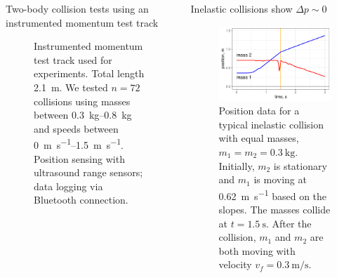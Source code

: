 \documentclass[pdf,serif]{beamer}
\begin{document}
\begin{frame}{}
\begin{columns}[T,totalwidth=\textwidth]
\begin{column}{14.33in}
\begin{minipage}[t][\textheight]{\linewidth}
\begin{block}{Two-body collision tests using an instrumented momentum test track}
\begin{figure}[h]
\begin{center}
\end{center}
\caption{Instrumented momentum test track used for experiments. Total length \SI{2.1}{\meter}. We tested $n=72$ collisions using masses between \SIrange{0.3}{0.8}{\kilo\gram} and speeds between \SIrange{0}{1.5}{\meter\per\second}. Position sensing with ultrasound range sensors; data logging via Bluetooth connection.}
\label{fig:methods1}
\end{figure}
\end{block}
\vfill
\end{minipage}
\end{column}

\begin{column}{14.33in}
\begin{minipage}[t][\textheight]{\linewidth}
\begin{block}{Inelastic collisions show $\Delta p\sim 0$}
\begin{figure}
\begin{center}
\includegraphics[width=0.8\columnwidth]{inelastic.pdf}
\end{center}
\caption{Position data for a typical inelastic collision with equal masses, $m_1=m_2=\SI{0.3}{\kilo\gram}$. Initially, $m_2$ is stationary and $m_1$ is moving at \SI{0.62}{\meter\per\second} based on the slopes. The masses collide at $t=\SI{1.5}{\second}$. After the collision, $m_1$ and $m_2$ are both moving with velocity $v_f=\SI{0.3}{\meter\per\second}$. }
\label{fig:results1}
\end{figure}
\begin{figure}
\begin{center}

\end{center}
\end{figure}
\end{block}
\end{minipage}
\end{column}
\end{columns}
\end{frame}
\end{document}
